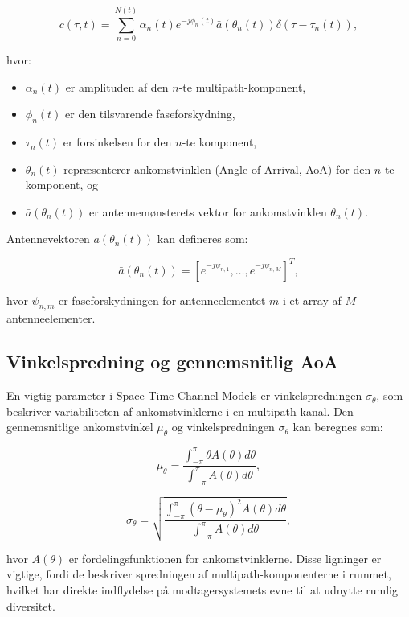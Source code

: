 \documentclass[a4paper,12pt]{book}
\begin{document}
	\[
	c(\tau, t) = \sum_{n=0}^{N(t)} \alpha_n(t) e^{-j \phi_n(t)} \bar{a}(\theta_n(t)) \delta(\tau - \tau_n(t)),
	\]
	
	hvor:
	\begin{itemize}
		\item \( \alpha_n(t) \) er amplituden af den \(n\)-te multipath-komponent,
		\item \( \phi_n(t) \) er den tilsvarende faseforskydning,
		\item \( \tau_n(t) \) er forsinkelsen for den \(n\)-te komponent,
		\item \( \theta_n(t) \) repræsenterer ankomstvinklen (Angle of Arrival, AoA) for den \(n\)-te komponent, og
		\item \( \bar{a}(\theta_n(t)) \) er antennemønsterets vektor for ankomstvinklen \( \theta_n(t) \).
	\end{itemize}

	Antennevektoren \( \bar{a}(\theta_n(t)) \) kan defineres som:
	
	\[
	\bar{a}(\theta_n(t)) = \left[ e^{-j \psi_{n,1}}, \ldots, e^{-j \psi_{n,M}} \right]^T,
	\]
	
	hvor \( \psi_{n,m} \) er faseforskydningen for antenneelementet \( m \) i et array af \( M \) antenneelementer.
	
	\subsection{Vinkelspredning og gennemsnitlig AoA}
	En vigtig parameter i Space-Time Channel Models er vinkelspredningen \( \sigma_{\theta} \), som beskriver variabiliteten af ankomstvinklerne i en multipath-kanal. Den gennemsnitlige ankomstvinkel \( \mu_{\theta} \) og vinkelspredningen \( \sigma_{\theta} \) kan beregnes som:
	
	\[
	\mu_{\theta} = \frac{\int_{-\pi}^{\pi} \theta A(\theta) d\theta}{\int_{-\pi}^{\pi} A(\theta) d\theta},
	\]
	
	\[
	\sigma_{\theta} = \sqrt{\frac{\int_{-\pi}^{\pi} (\theta - \mu_{\theta})^2 A(\theta) d\theta}{\int_{-\pi}^{\pi} A(\theta) d\theta}},
	\]
	
	hvor \( A(\theta) \) er fordelingsfunktionen for ankomstvinklerne. Disse ligninger er vigtige, fordi de beskriver spredningen af multipath-komponenterne i rummet, hvilket har direkte indflydelse på modtagersystemets evne til at udnytte rumlig diversitet.
	
\end{document}
